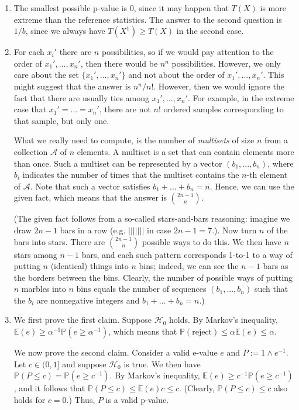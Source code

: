 \documentclass[11pt]{article}
\theoremstyle{plain}
\theoremstyle{definition}
\newcommand{\A}{\mathcal{A}}
\newcommand{\Hy}{\mathcal{H}}
\newcommand{\pr}{\mathbb{P}}
\begin{document}
\begin{sols}
\begin{enumerate}
\item The smallest possible p-value is 0, since it may happen that $T(X)$ is more extreme than the reference statistics. The answer to the second question is $1/b$, since we always have $T(X^1)\geq T(X)$ in the second case.

\item
For each $x_i'$ there are $n$ possibilities, so if we would pay attention to the order of $x_1',...,x_n'$, then there would be $n^n$ possibilities. However,  we only care about the set $\{x_1',...,x_n'\}$  and not about the order of $x_1',...,x_n'$. This might suggest that the answer is $n^n/n!$. However, then we would ignore the fact that there are usually ties among $x_1',...,x_n'.$ For example, in the extreme case that $x_1'=...=x_n'$, there are not $n!$ ordered samples corresponding to that sample, but only one.

What we really need to compute, is the number of \emph{multisets} of size $n$ from a collection $\A$ of $n$ elements. A multiset is a set that can contain elements more than once.
Such a multiset can be represented by a vector $(b_1,...,b_n)$, where $b_i$ indicates the number of times that the multiset contains the $n$-th element of $\A$. Note that such a vector satisfies $b_1+...+b_n=n$. Hence, we can use the given fact, which means that the answer is $\binom{2n-1}{n}.$ 

(The given fact follows from a so-called stars-and-bars reasoning:
imagine we draw $2n-1$ bars in a row (e.g. $|||||||$ in case $2n-1=7$.). Now turn $n$ of the bars into stars. There are $\binom{2n-1}{n}$ possible ways to do this.  We then have $n$ stars among $n-1$ bars, and each such pattern corresponds 1-to-1 to a way of putting $n$ (identical) things into $n$ bins; indeed, we can see the $n-1$ bars as the borders between the bins. Clearly, the number of possible ways of putting $n$ marbles into $n$ bins equals the number of sequences $(b_1,...,b_n)$ such that the $b_i$ are nonnegative integers and $b_1+...+b_n=n$.)

\item 
We first prove the first claim.
Suppose $\Hy_0$ holds.
By Markov's inequality, 
$\mathbb{E}(e)\geq \alpha^{-1}\pr(e\geq \alpha^{-1})$, which means that $\pr(\text{reject})\leq \alpha \mathbb{E}(e)\leq \alpha$.

We now prove the second claim. Consider  a valid e-value $e$ and   $P:=1\wedge e^{-1}$.
Let $c\in(0,1]$ and suppose $\Hy_0$ is true. We then have $\pr(P\leq c) = \pr(e\geq c^{-1}) $. By Markov's inequality, $\mathbb{E}(e)\geq c^{-1}\pr(e\geq c^{-1})$, and it follows that $\pr(P\leq c)\leq \mathbb{E}(e) c\leq c$. (Clearly, $\pr(P\leq c)\leq c$ also holds for $c=0$.) Thus, $P$ is a valid p-value.




\end{enumerate}

\end{sols}
\end{document}
